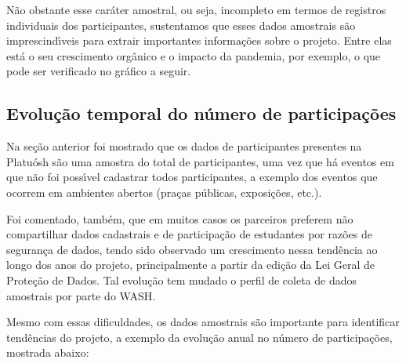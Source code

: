 \documentclass[
12pt,		%
openright,	%
twoside,  %
a4paper,			%
chapter=TITLE,		%
english,			%
french,				%
spanish,			%
brazil				%
]{USPSC-classe/USPSC}
\begin{document}
N\~ao obstante esse car\'ater amostral, ou seja, incompleto em termos de registros individuais dos participantes, sustentamos que esses dados amostrais s\~ao imprescind\'{\i}veis para extrair importantes informa\c{c}\~oes sobre o projeto. Entre elas est\'a o seu crescimento org\^anico e o impacto da pandemia, por exemplo, o que pode ser verificado no gr\'afico a seguir.


\subsection[Evolu\c{c}\~ao temporal do n\'umero de participa\c{c}\~oes]{Evolu\c{c}\~ao temporal do n\'umero de participa\c{c}\~oes}\label{Evolu\c{c}\~ao temporal do n\'umero de participa\c{c}\~oes}
Na se\c{c}\~ao anterior foi mostrado que os dados de participantes presentes na Platu\'osh s\~ao uma amostra do total de participantes, uma vez que h\'a eventos em que n\~ao foi poss\'{\i}vel cadastrar todos participantes, a exemplo dos eventos que ocorrem em ambientes abertos (pra\c{c}as p\'ublicas, exposi\c{c}\~oes, etc.).


Foi comentado, tamb\'em, que em muitos casos os parceiros preferem n\~ao compartilhar dados cadastrais e de participa\c{c}\~ao de estudantes por raz\~oes de seguran\c{c}a de dados, tendo sido observado um crescimento nessa tend\^encia ao longo dos anos do projeto, principalmente a partir da edi\c{c}\~ao da Lei Geral de Prote\c{c}\~ao de Dados. Tal evolu\c{c}\~ao tem mudado o perfil de coleta de dados amostrais por parte do WASH.


Mesmo com essas dificuldades, os dados amostrais s\~ao importante para identificar tend\^encias do projeto, a exemplo da evolu\c{c}\~ao anual no n\'umero de participa\c{c}\~oes, mostrada abaixo:
\end{document}
